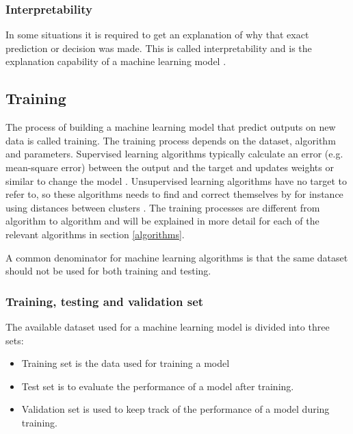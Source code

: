 \documentclass[english, a4paper]{report}
\begin{document}
{{{            \subsubsection{Interpretability}
            {
                In some situations it is required to get an explanation of why that exact prediction or decision was made. This is called interpretability and is the explanation capability of a machine learning model \cite{mlKelleher}.
            } 
        }
        
        \subsection{Training}\label{training}
        {
            The process of building a machine learning model that predict outputs on new data is called training. The training process depends on the dataset, algorithm and parameters. Supervised learning algorithms typically calculate an error (e.g. mean-square error) between the output and the target and updates weights or similar to change the model \cite{mlKelleher}. Unsupervised learning algorithms have no target to refer to, so these algorithms needs to find and correct themselves by for instance using distances between clusters \cite{artificialIntelligence}. The training processes are different from algorithm to algorithm and will be explained in more detail for each of the relevant algorithms in section \ref{algorithms}.
            \par 
            A common denominator for machine learning algorithms is that the same dataset should not be used for both training and testing. 
            
            \subsubsection{Training, testing and validation set}
            {
                The available dataset used for a machine learning model is divided into three sets:
                
                \begin{itemize}
                    \item Training set is the data used for training a model
                    \item Test set is to evaluate the performance of a model after training.
                    \item Validation set is used to keep track of the performance of a model during training.
                    

\end{itemize}}}}}
\end{document}

